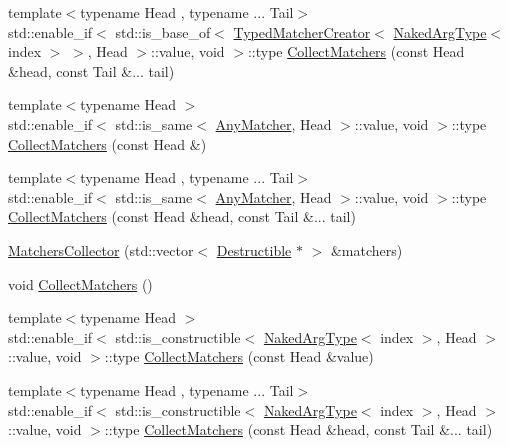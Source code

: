 \begin{DoxyCompactItemize}
\item 
{\footnotesize template$<$typename Head , typename ... Tail$>$ }\\std\+::enable\+\_\+if$<$ std\+::is\+\_\+base\+\_\+of$<$ \mbox{\hyperlink{structfakeit_1_1TypedMatcherCreator}{Typed\+Matcher\+Creator}}$<$ \mbox{\hyperlink{classfakeit_1_1MatchersCollector_aeda8ced6a2f0cb7c6e4f916f18a91730}{Naked\+Arg\+Type}}$<$ index $>$ $>$, Head $>$\+::value, void $>$\+::type \mbox{\hyperlink{classfakeit_1_1MatchersCollector_a40994e9802e933fb1bae91870d666dcb}{Collect\+Matchers}} (const Head \&head, const Tail \&... tail)
\item 
{\footnotesize template$<$typename Head $>$ }\\std\+::enable\+\_\+if$<$ std\+::is\+\_\+same$<$ \mbox{\hyperlink{structfakeit_1_1AnyMatcher}{Any\+Matcher}}, Head $>$\+::value, void $>$\+::type \mbox{\hyperlink{classfakeit_1_1MatchersCollector_a89350af9ba2e7aaead8bd7b007f03631}{Collect\+Matchers}} (const Head \&)
\item 
{\footnotesize template$<$typename Head , typename ... Tail$>$ }\\std\+::enable\+\_\+if$<$ std\+::is\+\_\+same$<$ \mbox{\hyperlink{structfakeit_1_1AnyMatcher}{Any\+Matcher}}, Head $>$\+::value, void $>$\+::type \mbox{\hyperlink{classfakeit_1_1MatchersCollector_a5bc97a3d729b1bb67e372181ad88b77d}{Collect\+Matchers}} (const Head \&head, const Tail \&... tail)
\item 
\mbox{\hyperlink{classfakeit_1_1MatchersCollector_ac5e0254e23626d189f329de8051137a6}{Matchers\+Collector}} (std\+::vector$<$ \mbox{\hyperlink{classfakeit_1_1Destructible}{Destructible}} $\ast$ $>$ \&matchers)
\item 
void \mbox{\hyperlink{classfakeit_1_1MatchersCollector_a2d9a08a347c3915daa33f307a274f13c}{Collect\+Matchers}} ()
\item 
{\footnotesize template$<$typename Head $>$ }\\std\+::enable\+\_\+if$<$ std\+::is\+\_\+constructible$<$ \mbox{\hyperlink{classfakeit_1_1MatchersCollector_aeda8ced6a2f0cb7c6e4f916f18a91730}{Naked\+Arg\+Type}}$<$ index $>$, Head $>$\+::value, void $>$\+::type \mbox{\hyperlink{classfakeit_1_1MatchersCollector_affd243a89f758239d77c70dce6318087}{Collect\+Matchers}} (const Head \&value)
\item 
{\footnotesize template$<$typename Head , typename ... Tail$>$ }\\std\+::enable\+\_\+if$<$ std\+::is\+\_\+constructible$<$ \mbox{\hyperlink{classfakeit_1_1MatchersCollector_aeda8ced6a2f0cb7c6e4f916f18a91730}{Naked\+Arg\+Type}}$<$ index $>$, Head $>$\+::value, void $>$\+::type \mbox{\hyperlink{classfakeit_1_1MatchersCollector_a29c5245d03b8fab3773455c087edde74}{Collect\+Matchers}} (const Head \&head, const Tail \&... tail)

\end{DoxyCompactItemize}
